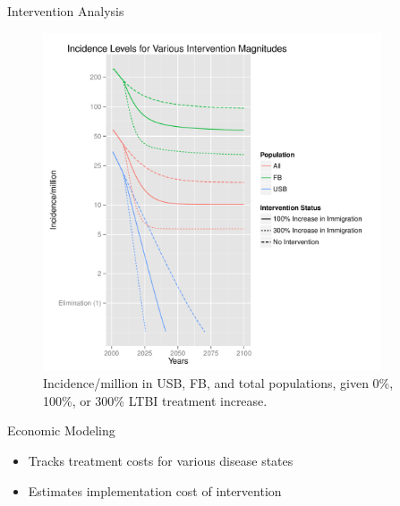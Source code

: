 \documentclass[final]{beamer}
\begin{document}
\begin{frame}
\begin{columns}
\begin{column}{.3\textwidth}
\begin{block}{Intervention Analysis}
\begin{figure}[h]
\begin{center}
            \includegraphics[height=10cm,width=\textwidth]{incLTBItrmtIncGrouped}
          \end{center}
          \caption{Incidence/million in USB, FB, and total populations,
                   given 0\%, 100\%, or 300\% LTBI treatment increase.}
          \label{fig:incLTBItrmt_incidence}
        \end{figure}
      \end{block}
      \begin{block}{Economic Modeling}
        \begin{itemize}
          \item Tracks treatment costs for various disease states
          \item Estimates implementation cost of intervention
        \end{itemize}
        \begin{columns}
          \begin{column}{.66\textwidth}
            \begin{figure}[h]
              \begin{center}

\end{center}
\end{figure}
\end{column}
\end{columns}
\end{block}
\end{column}
\end{columns}
\end{frame}
\end{document}
